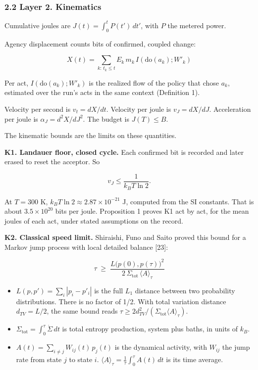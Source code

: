 \documentclass[
  10pt,
]{article}
\providecommand{\tightlist}{%
  \setlength{\itemsep}{0pt}\setlength{\parskip}{0pt}}
\begin{document}
\subsubsection{2.2 Layer 2. Kinematics}\label{layer-2.-kinematics}

Cumulative joules are \(J(t) = \int_0^t P(t')\,dt'\), with \(P\) the
metered power.

Agency displacement counts bits of confirmed, coupled change:

\[X(t) = \sum_{k:\,t_k \le t} E_k\, m_k\, I(\mathrm{do}(a_k); W'_k)\]

Per act, \(I(\mathrm{do}(a_k); W'_k)\) is the realized flow of the
policy that chose \(a_k\), estimated over the run's acts in the same
context (Definition 1).

Velocity per second is \(v_t = dX/dt\). Velocity per joule is
\(v_J = dX/dJ\). Acceleration per joule is \(\alpha_J = d^2X/dJ^2\). The
budget is \(J(T) \le B\).

The kinematic bounds are the limits on these quantities.

\textbf{K1. Landauer floor, closed cycle.} Each confirmed bit is
recorded and later erased to reset the acceptor. So

\[v_J \le \frac{1}{k_B T \ln 2}.\]

At \(T = 300\) K, \(k_B T \ln 2 \approx 2.87 \times 10^{-21}\) J,
computed from the SI constants. That is about \(3.5 \times 10^{20}\)
bits per joule. Proposition 1 proves K1 act by act, for the mean joules
of each act, under stated assumptions on the record.

\textbf{K2. Classical speed limit.} Shiraishi, Funo and Saito proved
this bound for a Markov jump process with local detailed balance
{[}23{]}:

\[\tau \;\ge\; \frac{L\big(p(0),p(\tau)\big)^2}{2\,\Sigma_{\mathrm{tot}}\,\langle A\rangle_\tau}\]

\begin{itemize}
\tightlist
\item
  \(L(p,p') = \sum_i |p_i - p'_i|\) is the full \(L_1\) distance between
  two probability distributions. There is no factor of 1/2. With total
  variation distance \(d_{TV} = L/2\), the same bound reads
  \(\tau \ge 2 d_{TV}^2/(\Sigma_{\mathrm{tot}}\langle A\rangle_\tau)\).
\item
  \(\Sigma_{\mathrm{tot}} = \int_0^\tau \dot\Sigma\,dt\) is total
  entropy production, system plus baths, in units of \(k_B\).
\item
  \(A(t) = \sum_{i\ne j} W_{ij}(t)\,p_j(t)\) is the dynamical activity,
  with \(W_{ij}\) the jump rate from state \(j\) to state \(i\).
  \(\langle A\rangle_\tau = \frac{1}{\tau}\int_0^\tau A(t)\,dt\) is its
  time average.
\end{itemize}
\end{document}
